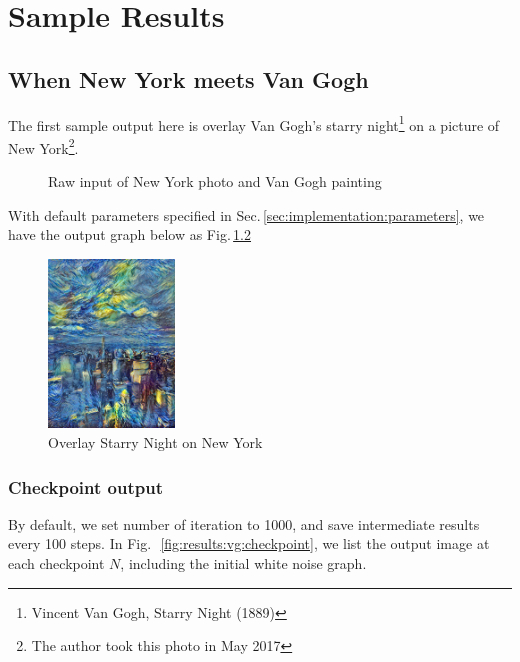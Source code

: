 
\chapter{Sample Results}
\label{chap:results}


\section{When New York meets Van Gogh}

The first sample output here is overlay Van Gogh's starry night\footnote{Vincent Van Gogh,
Starry Night (1889)}
on a picture of New York\footnote{The author took this photo in May 2017}.

    \begin{figure}[!hbt]
    \center
    \caption{Raw input of New York photo and Van Gogh painting}
    \label{fig:results:vg:origin}
    \end{figure}

With default parameters specified in Sec.\,\ref{sec:implementation:parameters},
we have the output graph below as Fig.\,\ref{fig:results:vg:final}

    \begin{figure}[!hbt]
    \center
    \includegraphics[width=0.3\textwidth]{output/vg_final.jpg}
    \caption{Overlay Starry Night on New York}
    \label{fig:results:vg:final}
    \end{figure}


\subsection{Checkpoint output}
\label{sec:results:vg:checkpoint}

By default, we set number of iteration to 1000, and save intermediate results every 100 steps.
In Fig.\,~\ref{fig:results:vg:checkpoint}, we list the output image at each checkpoint $N$,
including the initial white noise graph.

